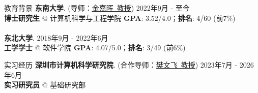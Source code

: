 \documentclass{cv} %
\newcommand{\mei}{\end{myitemize}\vspace{0.6ex}}
\begin{document}
\begin{rSection}[MITRed]{教育背景}
{\textbf{东南大学}. (导师：\href{https://jujuhoo.github.io/}{金嘉晖~教授})} \hfill {2022年9月 - 至今}
\\ \textbf{博士研究生} @ 计算机科学与工程学院
\hfill { \textbf{GPA}: 3.52/4.0；\textbf{排名}: 4/60 (前7\%)}
\\\\
{\textbf{东北大学}}. \hfill {2018年9月 - 2022年6月}
\\ \textbf{工学学士} @ 软件学院
\hfill { \textbf{GPA}: 4.07/5.0；\textbf{排名}: 3/49 (前6\%)}
\end{rSection}

\begin{rSection}[MITRed]{实习经历}
{\bf 深圳市计算机科学研究院}. (合作导师：\href{https://homepages.inf.ed.ac.uk/wenfei/}{樊文飞~教授}) \hfill {2023年7月 - 2026年6月}\\
{\bf 实习研究员} @ 基础研究部
\end{rSection}


\end{document}

